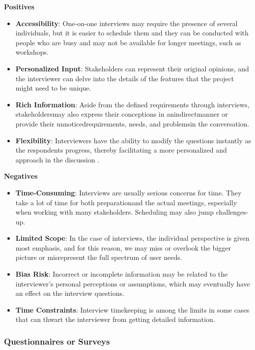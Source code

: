 \documentclass[conference]{IEEEtran}
\begin{document}
\textbf{Positives}
\begin{itemize}
    \item \textbf{Accessibility}: One-on-one interviews may require the presence of several individuals, but it is easier to schedule them and they can be conducted with people who are busy and may not be available for longer meetings, such as workshops.
    \item \textbf{Personalized Input}: Stakeholders can represent their original opinions, and the interviewer can delve into the details of the features that the project might need to be unique.
    \item \textbf{Rich Information}: Aside from the defined requirements through interviews, stakeholdersmay also express their conceptions in anindirectmanner or provide their unnoticedrequirements,  needs,  and  problemsin the conversation.
    \item \textbf{Flexibility}: Interviewers have the ability to modify the questions instantly as the respondents progress, thereby facilitating a more personalized and approach in the discussion \cite{cite9}.
\end{itemize}

\textbf{Negatives}
\begin{itemize}
    \item \textbf{Time-Consuming}: Interviews are usually serious concerns for time. They take a lot of time for both preparationand the actual meetings, especially when working with many stakeholders. Scheduling may also jump challenges-up.
    \item \textbf{Limited Scope}: In the case of interviews, the individual perspective is given most emphasis, and for this reason, we may miss or overlook the bigger picture or misrepresent the full spectrum of user needs.
    \item \textbf{Bias Risk}: Incorrect or incomplete information may be related to the interviewer's personal perceptions or assumptions, which may eventually have an effect on the interview questions.
    \item \textbf{Time Constraints}: Interview timekeeping is among the limits in some cases that can thwart the interviewer from getting detailed information.
\end{itemize}

\subsubsection{Questionnaires or Surveys}
\end{document}

